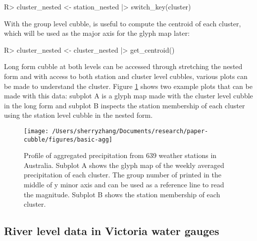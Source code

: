 \documentclass[
]{jss}
\begin{document}
\begin{CodeChunk}
\begin{CodeInput}
R> cluster_nested <- station_nested |> switch_key(cluster) 
\end{CodeInput}
\end{CodeChunk}

With the group level cubble,  is useful to compute
the centroid of each cluster, which will be used as the major axis for
the glyph map later:

\begin{CodeChunk}
\begin{CodeInput}
R> cluster_nested <- cluster_nested |> get_centroid()
\end{CodeInput}
\end{CodeChunk}

Long form cubble at both levels can be accessed through stretching the
nested form and with access to both station and cluster level cubbles,
various plots can be made to understand the cluster. Figure
\ref{fig:basic-agg} shows two example plots that can be made with this
data: subplot A is a glyph map made with the cluster level cubble in the
long form and subplot B inspects the station membership of each cluster
using the station level cubble in the nested form.

\begin{CodeChunk}
\begin{figure}

{\centering \texttt{[image: /Users/sherryzhang/Documents/research/paper-cubble/figures/basic-agg]} 

}

\caption[Profile of aggregated precipitation from 639 weather stations in Australia]{Profile of aggregated precipitation from 639 weather stations in Australia. Subplot A shows the glyph map of the weekly averaged precipitation of each cluster. The group number of printed in the middle of y minor axis and can be used as a reference line to read the magnitude. Subplot B shows the station membership of each cluster.}\label{fig:basic-agg}
\end{figure}
\end{CodeChunk}

\hypertarget{river-level-data-in-victoria-water-gauges}{%
\subsection{River level data in Victoria water
gauges}\label{river-level-data-in-victoria-water-gauges}}
\end{document}
